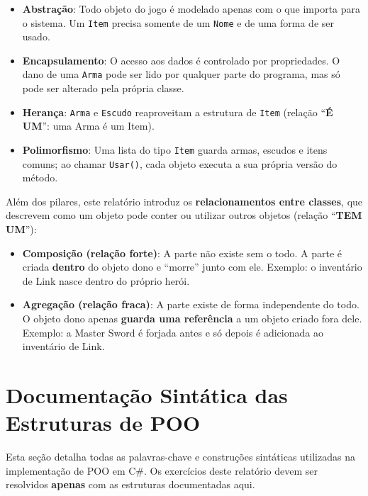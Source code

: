 \begin{itemize}
    \item \textbf{Abstração}: Todo objeto do jogo é modelado apenas com o que importa para o
    sistema. Um \texttt{Item} precisa somente de um \texttt{Nome} e de uma forma de ser usado.

    \item \textbf{Encapsulamento}: O acesso aos dados é controlado por propriedades. O dano de
    uma \texttt{Arma} pode ser lido por qualquer parte do programa, mas só pode ser alterado
    pela própria classe.

    \item \textbf{Herança}: \texttt{Arma} e \texttt{Escudo} reaproveitam a estrutura de
    \texttt{Item} (relação ``\textbf{É UM}'': uma Arma é um Item).

    \item \textbf{Polimorfismo}: Uma lista do tipo \texttt{Item} guarda armas, escudos e itens
    comuns; ao chamar \texttt{Usar()}, cada objeto executa a sua própria versão do método.
\end{itemize}

Além dos pilares, este relatório introduz os \textbf{relacionamentos entre classes}, que
descrevem como um objeto pode conter ou utilizar outros objetos (relação ``\textbf{TEM UM}''):

\begin{itemize}
    \item \textbf{Composição (relação forte)}: A parte não existe sem o todo. A parte é criada
    \textbf{dentro} do objeto dono e ``morre'' junto com ele. Exemplo: o inventário de Link nasce
    dentro do próprio herói.

    \item \textbf{Agregação (relação fraca)}: A parte existe de forma independente do todo. O
    objeto dono apenas \textbf{guarda uma referência} a um objeto criado fora dele. Exemplo: a
    Master Sword é forjada antes e só depois é adicionada ao inventário de Link.
\end{itemize}

\section{Documentação Sintática das Estruturas de POO}

Esta seção detalha todas as palavras-chave e construções sintáticas utilizadas na implementação
de POO em C\#. Os exercícios deste relatório devem ser resolvidos \textbf{apenas} com as
estruturas documentadas aqui.

